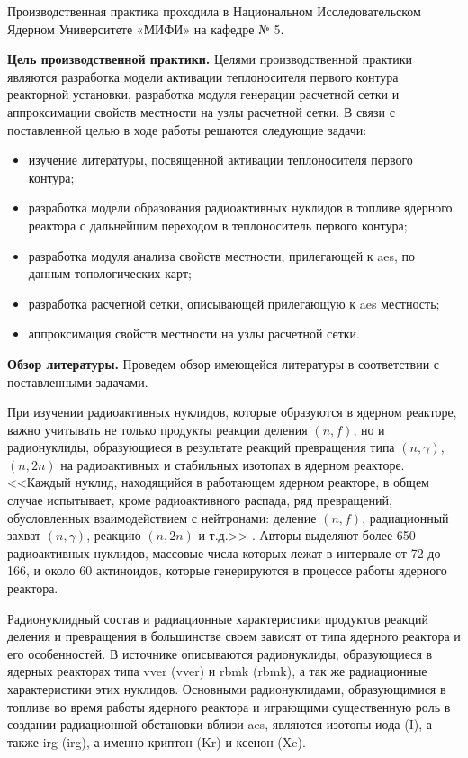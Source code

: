 
Производственная практика проходила в Национальном Исследовательском Ядерном Университете «МИФИ» на кафедре № 5. 

\textbf{Цель производственной практики.} Целями производственной практики являются разработка модели активации 
теплоносителя первого контура реакторной установки, разработка модуля генерации расчетной сетки и аппроксимации свойств 
местности на узлы расчетной сетки. В связи с поставленной целью в ходе работы решаются следующие задачи:

\begin{itemize}
	\item изучение литературы, посвященной активации теплоносителя первого контура;
	\item разработка модели образования радиоактивных нуклидов в топливе ядерного реактора с дальнейшим переходом в
		теплоноситель первого контура;
	\item разработка модуля анализа свойств местности, прилегающей к \ac{aes}, по данным топологических карт;
	\item разработка расчетной сетки, описывающей прилегающую к \ac{aes} местность;
	\item аппроксимация свойств местности на узлы расчетной сетки.
\end{itemize}

\textbf{Обзор литературы.} Проведем обзор имеющейся литературы в соответствии с поставленными задачами.

При изучении радиоактивных нуклидов, которые образуются в ядерном реакторе, важно учитывать не только продукты реакции 
деления $(n, f)$, но и радионуклиды, образующиеся в результате реакций превращения типа $(n, \gamma)$, $(n, 2n)$ на 
радиоактивных и стабильных изотопах в ядерном реакторе. <<Каждый нуклид, находящийся в работающем ядерном реакторе, в 
общем случае испытывает, кроме радиоактивного распада, ряд превращений, обусловленных взаимодействием с нейтронами: 
деление $(n, f)$, радиационный захват $(n, \gamma)$, реакцию $(n, 2n)$ и т.д.>> \citep[с.~6]{kolobashkin}.  
Авторы \cite{kolobashkin} выделяют более 650 радиоактивных нуклидов, массовые числа которых лежат в интервале от 72 до 
166, и около 60 актиноидов, которые генерируются в процессе работы ядерного реактора.

Радионуклидный состав и радиационные характеристики продуктов реакций деления и превращения в большинстве своем зависят 
от типа ядерного реактора и его особенностей. В источнике \cite{gusev_bio} описываются радионуклиды, образующиеся в 
ядерных реакторах типа \ac{vver} (\acl{vver}) и \ac{rbmk} (\acl{rbmk}), а так же радиационные характеристики этих 
нуклидов. Основными радионуклидами, образующимися в топливе во время работы ядерного реактора и играющими существенную 
роль в создании радиационной обстановки вблизи \ac{aes}, являются изотопы иода (I), а также \ac{irg} (\acl{irg}), а 
именно криптон (Kr) и ксенон (Xe).

